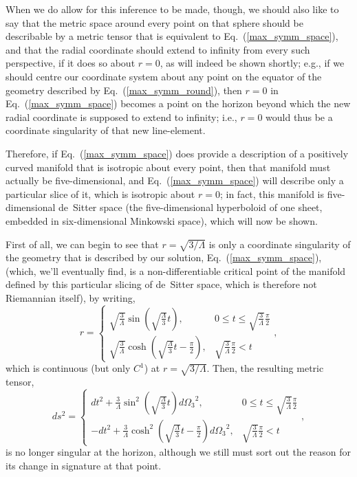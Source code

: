 When we do allow for this inference to be made, though, we should also like to say that the metric space around every point on that sphere should be describable by a metric tensor that is equivalent to Eq.~(\ref{max_symm_space}), and that the radial coordinate should extend to infinity from every such perspective, if it does so about $r=0$, as will indeed be shown shortly; e.g., if we should centre our coordinate system about any point on the equator of the geometry described by Eq.~(\ref{max_symm_round}), then $r=0$ in Eq.~(\ref{max_symm_space}) becomes a point on the horizon beyond which the new radial coordinate is supposed to extend to infinity; i.e., $r=0$ would thus be a coordinate singularity of that new line-element.

Therefore, if Eq.~(\ref{max_symm_space}) does provide a description of a positively curved manifold that is isotropic about every point, then that manifold must actually be five-dimensional, and Eq.~(\ref{max_symm_space}) will describe only a particular slice of it, which is isotropic about $r=0$; in fact, this manifold is five-dimensional de~Sitter space (the five-dimensional hyperboloid of one sheet, embedded in six-dimensional Minkowski space), which will now be shown.

First of all, we can begin to see that $r=\sqrt{3/\Lambda}$ is only a coordinate singularity of the geometry that is described by our solution, Eq.~(\ref{max_symm_space}), (which, we'll eventually find, is a non-differentiable critical point of the manifold defined by this particular slicing of de~Sitter space, which is therefore not Riemannian itself), by writing,
\begin{equation}
r=\left\{\begin{array}{ll}
\sqrt{\frac{3}{\Lambda}}\sin\left(\sqrt{\frac{\Lambda}{3}}t\right), & 0\leq{t}\leq\sqrt{\frac{3}{\Lambda}}\frac{\pi}{2}  \\ 
\sqrt{\frac{3}{\Lambda}}\cosh\left(\sqrt{\frac{\Lambda}{3}}t-\frac{\pi}{2}\right), & \sqrt{\frac{3}{\Lambda}}\frac{\pi}{2}<t
\end{array}\right.,\label{r(t)}
\end{equation}
which is continuous (but only $C^1$) at $r=\sqrt{3/\Lambda}$. Then, the resulting metric tensor,
\begin{equation}
ds^2=\left\{\begin{array}{ll}
dt^2+\frac{3}{\Lambda}\sin^2\left(\sqrt{\frac{\Lambda}{3}}t\right){d\Omega_3}^2, & 0\leq{t}\leq\sqrt{\frac{3}{\Lambda}}\frac{\pi}{2}  \\ 
-dt^2+\frac{3}{\Lambda}\cosh^2\left(\sqrt{\frac{\Lambda}{3}}t-\frac{\pi}{2}\right){d\Omega_3}^2, & \sqrt{\frac{3}{\Lambda}}\frac{\pi}{2}<t
\end{array}\right.,\label{max_symm_cont}
\end{equation}
is no longer singular at the horizon, although we still must sort out the reason for its change in signature at that point.

